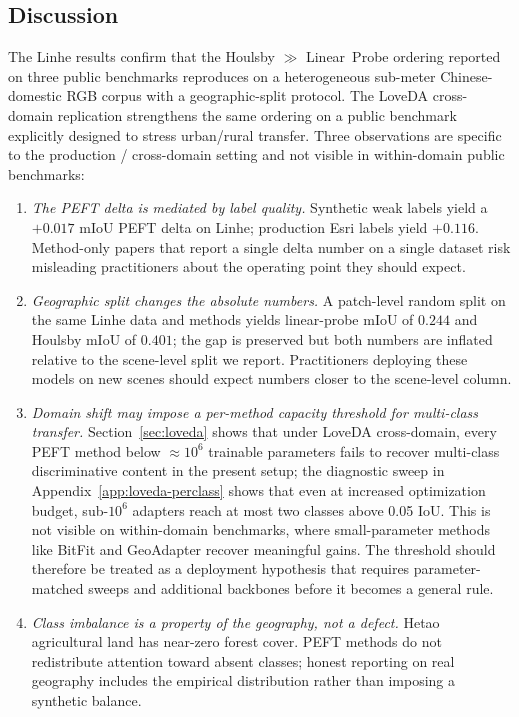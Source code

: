 \subsection{Discussion}

The Linhe results confirm that the Houlsby $\gg$ Linear~Probe ordering reported on three public benchmarks reproduces on a heterogeneous sub-meter Chinese-domestic RGB corpus with a geographic-split protocol. The LoveDA cross-domain replication strengthens the same ordering on a public benchmark explicitly designed to stress urban/rural transfer. Three observations are specific to the production / cross-domain setting and not visible in within-domain public benchmarks:

\begin{enumerate}[leftmargin=1.5em,itemsep=0.2em]
    \item \emph{The PEFT delta is mediated by label quality.} Synthetic weak labels yield a $+0.017$ mIoU PEFT delta on Linhe; production Esri labels yield $+0.116$. Method-only papers that report a single delta number on a single dataset risk misleading practitioners about the operating point they should expect.
    \item \emph{Geographic split changes the absolute numbers.} A patch-level random split on the same Linhe data and methods yields linear-probe mIoU of $0.244$ and Houlsby mIoU of $0.401$; the gap is preserved but both numbers are inflated relative to the scene-level split we report. Practitioners deploying these models on new scenes should expect numbers closer to the scene-level column.
    \item \emph{Domain shift may impose a per-method capacity threshold for multi-class transfer.} Section~\ref{sec:loveda} shows that under LoveDA cross-domain, every PEFT method below $\approx$$10^6$ trainable parameters fails to recover multi-class discriminative content in the present setup; the diagnostic sweep in Appendix~\ref{app:loveda-perclass} shows that even at increased optimization budget, sub-$10^6$ adapters reach at most two classes above 0.05 IoU. This is not visible on within-domain benchmarks, where small-parameter methods like BitFit and GeoAdapter recover meaningful gains. The threshold should therefore be treated as a deployment hypothesis that requires parameter-matched sweeps and additional backbones before it becomes a general rule.
    \item \emph{Class imbalance is a property of the geography, not a defect.} Hetao agricultural land has near-zero forest cover. PEFT methods do not redistribute attention toward absent classes; honest reporting on real geography includes the empirical distribution rather than imposing a synthetic balance.
\end{enumerate}

